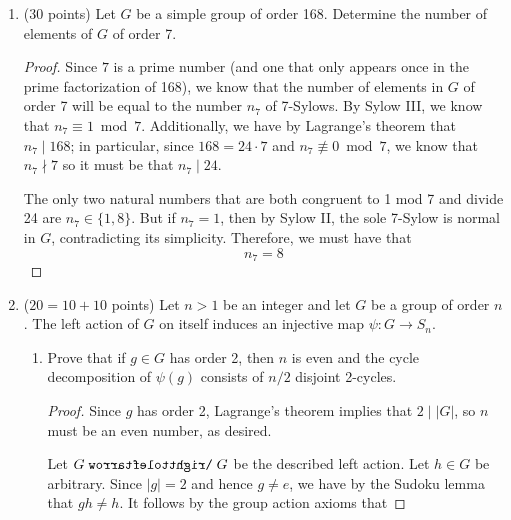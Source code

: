 \documentclass[../psets.tex]{subfiles}
\begin{document}
\begin{enumerate}
\begin{enumerate}
\begin{proof}
            Leg $G$ be a group of order $|G|=2688$. By Sylow I, $G$ has a 2-Sylow subgroup $P$. By Lagrange's theorem,
            \begin{equation*}
                |G/P| = |G|/|P| = 21
            \end{equation*}
            We know that $G\acts G/P$ transitively for $P$ a subgroup, so take $X=G/P$. Therefore, we have proven that the statement is
            \begin{equation*}
                \boxed{\text{True.}}
            \end{equation*}
        \end{proof}
    \end{enumerate}
    \item (30 points) Let $G$ be a simple group of order 168. Determine the number of elements of $G$ of order 7.
    \begin{proof}
        Since $7$ is a prime number (and one that only appears once in the prime factorization of 168), we know that the number of elements in $G$ of order 7 will be equal to the number $n_7$ of 7-Sylows. By Sylow III, we know that $n_7\equiv 1\bmod 7$. Additionally, we have by Lagrange's theorem that $n_7\mid 168$; in particular, since $168=24\cdot 7$ and $n_7\not\equiv 0\bmod 7$, we know that $n_7\nmid 7$ so it must be that $n_7\mid 24$.\par
        The only two natural numbers that are both congruent to 1 mod 7 and divide 24 are $n_7\in\{1,8\}$. But if $n_7=1$, then by Sylow II, the sole 7-Sylow is normal in $G$, contradicting its simplicity. Therefore, we must have that
        \begin{equation*}
            \boxed{n_7 = 8}
        \end{equation*}
    \end{proof}
    \item ($20=10+10$ points) Let $n>1$ be an integer and let $G$ be a group of order $n$. The left action of $G$ on itself induces an injective map $\psi:G\to S_n$.
    \begin{enumerate}
        \item Prove that if $g\in G$ has order 2, then $n$ is even and the cycle decomposition of $\psi(g)$ consists of $n/2$ disjoint 2-cycles.
        \begin{proof}
            Since $g$ has order 2, Lagrange's theorem implies that $2\mid|G|$, so $n$ must be an even number, as desired.\par
            Let $G\acts G$ be the described left action. Let $h\in G$ be arbitrary. Since $|g|=2$ and hence $g\neq e$, we have by the Sudoku lemma that $gh\neq h$. It follows by the group action axioms that

\end{proof}
\end{enumerate}
\end{enumerate}
\end{document}
